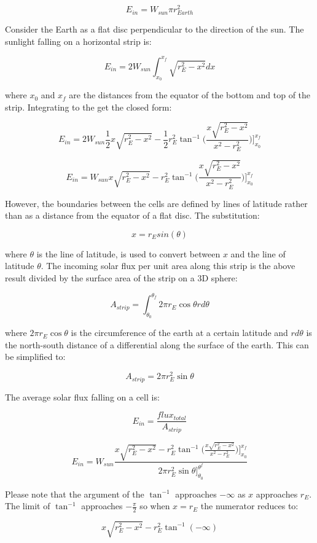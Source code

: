 \documentclass[12pt]{article} %
\begin{document}
$$E_{in} = W_{sun} \pi r_{Earth}^2$$

Consider the Earth as a flat disc perpendicular to the direction of the sun. The sunlight falling on a horizontal strip is:

$$E_{in} = 2 W_{sun} \int_{x_0}^{x_f} \sqrt{r_{E}^2 - x^2} dx$$


where $x_0$ and $x_f$ are the distances from the equator of the bottom and top of the strip. Integrating to the get the closed form:

$$E_{in} = 2 W_{sun} \frac{1}{2} x \sqrt{r_{E}^2 - x^2} - \frac{1}{2} r_{E}^2 \tan^{-1}\bigg({\frac{x \sqrt{r_{E}^2 - x^2}}{x^2 - r_{E}^2 }}\bigg)\bigg]_{x_0}^{x_f}$$

$$E_{in} = W_{sun} x \sqrt{r_{E}^2 - x^2} -  r_{E}^2 \tan^{-1}\bigg({\frac{x \sqrt{r_{E}^2 - x^2}}{x^2 - r_{E}^2 }}\bigg)\bigg]_{x_0}^{x_f}$$

However, the boundaries between the cells are defined by lines of latitude rather than as a distance from the equator of a flat disc. The substitution: 

$$x = r_{E} sin(\theta) $$

where $\theta$ is the line of latitude, is used to convert between $x$ and the line of latitude $\theta$. The incoming solar flux per
unit area along this strip is the above result divided by the surface area of the strip on a 3D sphere:

$$A_{strip} = \int_{\theta_{0}}^{\theta_{f}} 2 \pi r_{E} \cos{\theta} r d\theta $$

where $2 \pi r_{E} \cos{\theta}$ is the circumference of the earth at a certain latitude and $r d\theta$ is the north-south distance of a differential along the surface of the earth. This can be simplified to:

$$A_{strip} =  2 \pi r_{E}^2 \sin{\theta} $$

The average solar flux falling on a cell is:

$$E_{in} = \frac{flux_{total}}{A_{strip}}$$

$$\boxed{E_{in} = W_{sun}\frac{x \sqrt{r_{E}^2 - x^2} -  r_{E}^2 \tan^{-1}\bigg({\frac{x \sqrt{r_{E}^2 - x^2}}{x^2 - r_{E}^2 }}\bigg)\bigg]_{x_0}^{x_f}}{2 \pi r_{E}^2 \sin{\theta}]_{\theta_0}^{\theta^f}}}$$

Please note that the argument of the $\tan^{-1}$ approaches $-\infty$ as $x$ approaches $r_{E}$. The limit of $\tan^{-1}$ approaches $-\frac{\pi}{2}$ so when $x = r_{E}$ the numerator reduces to:

$$x \sqrt{r_{E}^2 - x^2} -  r_{E}^2 \tan^{-1}(-\infty)$$
\end{document}
